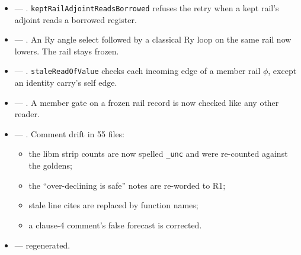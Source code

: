 \begin{itemize}
\begin{itemize}
    reader of the borrowed parent (\texttt{ChainWalk::isRecordedStripReaderOf}).
    \item The outer chain of a depth-2 nest is now uncomputed:
     FCNT changes from 3 to 4, with the
    evidence in its header.
  \end{itemize}
  \item {} --- .
  \texttt{keptRailAdjointReadsBorrowed} refuses the retry when a kept rail's adjoint reads a
  borrowed register.
  \item {} --- . An Ry angle select followed by
  a classical Ry loop on the same rail now lowers. The rail stays frozen.
  \item {} --- . \texttt{staleReadOfValue}
  checks each incoming edge of a member rail $\phi$, except an identity carry's self edge.
  \item {} --- . A member gate on a frozen rail
  record is now checked like any other reader.
  \item {} --- . Comment drift in 55 files:
  \begin{itemize}
    \item the libm strip counts are now spelled \texttt{\_unc} and were re-counted against
    the goldens;
    \item the ``over-declining is safe'' notes are re-worded to R1;
    \item stale  line cites are replaced by function names;
    \item a clause-4 comment's false forecast is corrected.
  \end{itemize}
  \item {} ---  regenerated.
\end{itemize}


